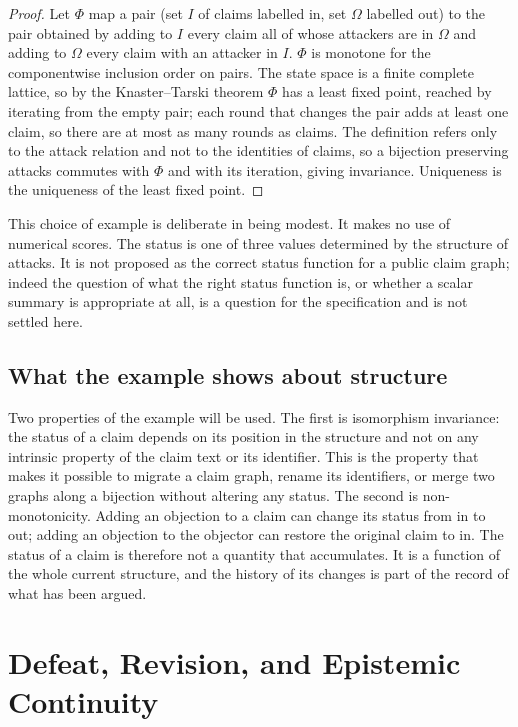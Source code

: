 \documentclass[11pt,twoside,openright]{book}
\theoremstyle{plain}
\theoremstyle{definition}
\theoremstyle{remark}
\begin{document}
\begin{proof}
Let $\Phi$ map a pair (set $I$ of claims labelled in, set $\Omega$ labelled out) to the pair obtained by adding to $I$ every claim all of whose attackers are in $\Omega$ and adding to $\Omega$ every claim with an attacker in $I$. $\Phi$ is monotone for the componentwise inclusion order on pairs. The state space is a finite complete lattice, so by the Knaster--Tarski theorem \cite{tarski1955} $\Phi$ has a least fixed point, reached by iterating from the empty pair; each round that changes the pair adds at least one claim, so there are at most as many rounds as claims. The definition refers only to the attack relation and not to the identities of claims, so a bijection preserving attacks commutes with $\Phi$ and with its iteration, giving invariance. Uniqueness is the uniqueness of the least fixed point.
\end{proof}

This choice of example is deliberate in being modest. It makes no use of numerical scores. The status is one of three values determined by the structure of attacks. It is not proposed as the correct status function for a public claim graph; indeed the question of what the right status function is, or whether a scalar summary is appropriate at all, is a question for the specification and is not settled here.

\section{What the example shows about structure}

Two properties of the example will be used. The first is isomorphism invariance: the status of a claim depends on its position in the structure and not on any intrinsic property of the claim text or its identifier. This is the property that makes it possible to migrate a claim graph, rename its identifiers, or merge two graphs along a bijection without altering any status. The second is non-monotonicity. Adding an objection to a claim can change its status from in to out; adding an objection to the objector can restore the original claim to in. The status of a claim is therefore not a quantity that accumulates. It is a function of the whole current structure, and the history of its changes is part of the record of what has been argued.

\chapter{Defeat, Revision, and Epistemic Continuity}\label{ch:revision}
\end{document}
